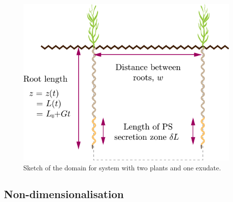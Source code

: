 \documentclass[11pt]{article}
\numberwithin{equation}{section}
\begin{document}
\begin{figure}[h]
    \centering
    \includegraphics[scale=0.7]{Figures/Second-plot.pdf}
    \caption{Sketch of the domain for system with two plants and one exudate.}
    \label{fig:system-Zinc}
\end{figure}


\subsection{Non-dimensionalisation}
\label{2-Base-Scaling}
\end{document}
